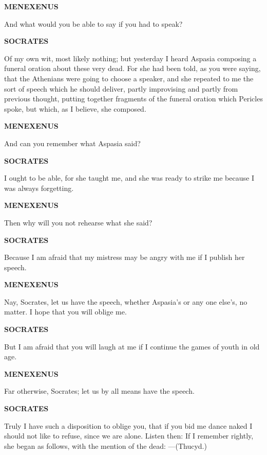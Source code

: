 \documentclass[11pt,letter]{article}
\begin{document}
\par \textbf{MENEXENUS}
\par   And what would you be able to say if you had to speak?

\par \textbf{SOCRATES}
\par   Of my own wit, most likely nothing; but yesterday I heard Aspasia composing a funeral oration about these very dead. For she had been told, as you were saying, that the Athenians were going to choose a speaker, and she repeated to me the sort of speech which he should deliver, partly improvising and partly from previous thought, putting together fragments of the funeral oration which Pericles spoke, but which, as I believe, she composed.

\par \textbf{MENEXENUS}
\par   And can you remember what Aspasia said?

\par \textbf{SOCRATES}
\par   I ought to be able, for she taught me, and she was ready to strike me because I was always forgetting.

\par \textbf{MENEXENUS}
\par   Then why will you not rehearse what she said?

\par \textbf{SOCRATES}
\par   Because I am afraid that my mistress may be angry with me if I publish her speech.

\par \textbf{MENEXENUS}
\par   Nay, Socrates, let us have the speech, whether Aspasia's or any one else's, no matter. I hope that you will oblige me.

\par \textbf{SOCRATES}
\par   But I am afraid that you will laugh at me if I continue the games of youth in old age.

\par \textbf{MENEXENUS}
\par   Far otherwise, Socrates; let us by all means have the speech.

\par \textbf{SOCRATES}
\par   Truly I have such a disposition to oblige you, that if you bid me dance naked I should not like to refuse, since we are alone. Listen then:  If I remember rightly, she began as follows, with the mention of the dead: —(Thucyd.)
\end{document}
